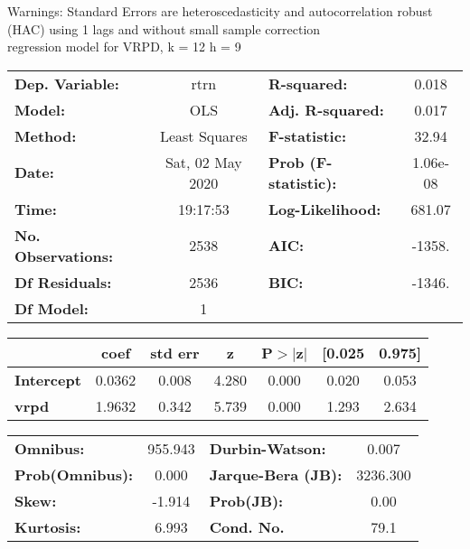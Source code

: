 Warnings: \newline
 [1] Standard Errors are heteroscedasticity and autocorrelation robust (HAC) using 1 lags and without small sample correction\\ 

regression model for VRPD, k = 12 h = 9\begin{center}
\begin{tabular}{lclc}
\toprule
\textbf{Dep. Variable:}    &       rtrn       & \textbf{  R-squared:         } &     0.018   \\
\textbf{Model:}            &       OLS        & \textbf{  Adj. R-squared:    } &     0.017   \\
\textbf{Method:}           &  Least Squares   & \textbf{  F-statistic:       } &     32.94   \\
\textbf{Date:}             & Sat, 02 May 2020 & \textbf{  Prob (F-statistic):} &  1.06e-08   \\
\textbf{Time:}             &     19:17:53     & \textbf{  Log-Likelihood:    } &    681.07   \\
\textbf{No. Observations:} &        2538      & \textbf{  AIC:               } &    -1358.   \\
\textbf{Df Residuals:}     &        2536      & \textbf{  BIC:               } &    -1346.   \\
\textbf{Df Model:}         &           1      & \textbf{                     } &             \\
\bottomrule
\end{tabular}
\begin{tabular}{lcccccc}
                   & \textbf{coef} & \textbf{std err} & \textbf{z} & \textbf{P$> |$z$|$} & \textbf{[0.025} & \textbf{0.975]}  \\
\midrule
\textbf{Intercept} &       0.0362  &        0.008     &     4.280  &         0.000        &        0.020    &        0.053     \\
\textbf{vrpd}      &       1.9632  &        0.342     &     5.739  &         0.000        &        1.293    &        2.634     \\
\bottomrule
\end{tabular}
\begin{tabular}{lclc}
\textbf{Omnibus:}       & 955.943 & \textbf{  Durbin-Watson:     } &    0.007  \\
\textbf{Prob(Omnibus):} &   0.000 & \textbf{  Jarque-Bera (JB):  } & 3236.300  \\
\textbf{Skew:}          &  -1.914 & \textbf{  Prob(JB):          } &     0.00  \\
\textbf{Kurtosis:}      &   6.993 & \textbf{  Cond. No.          } &     79.1  \\
\bottomrule
\end{tabular}
\end{center}

